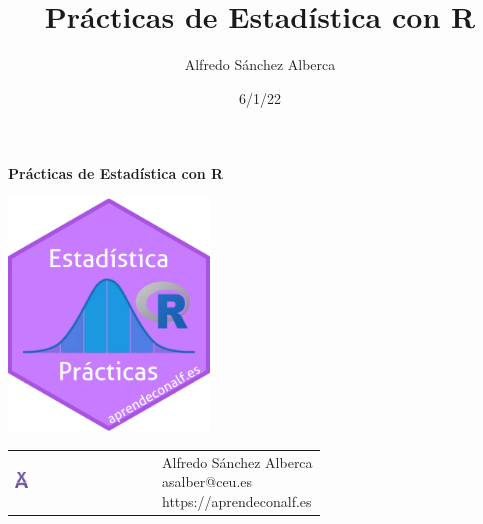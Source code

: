 \documentclass[
  a4paper,
]{scrreport}
\title{Prácticas de Estadística con R}
\author{Alfredo Sánchez Alberca}
\date{6/1/22}
\renewcommand*\contentsname{Tabla de contenidos}
\newcommand\contentsname{Tabla de contenidos}
\theoremstyle{definition}
\theoremstyle{remark}
\begin{document}
\begin{titlepage}

\begin{center}
\vspace*{5cm}

\Huge
{\textbf{\textsf{Prácticas de Estadística con R}}}

\vspace{0.5cm}
\LARGE
{\textbf{\textsf{}}}

\vspace{1.5cm}

\includegraphics[width=0.4\textwidth]{img/logos/sticker-estadistica-r.png}
\end{center}

\vfill

\begin{flushleft}
\begin{tabular}{ll}
\includegraphics[width=0.1\textwidth]{img/logos/aprendeconalf.png} & \parbox[b]{5cm}{\Large\textsf{Alfredo
Sánchez
Alberca}\\ \textsf{asalber@ceu.es} \\ \textsf{https://aprendeconalf.es}}
\end{tabular}
\end{flushleft}
\end{titlepage}\ifdefined\Shaded\renewenvironment{Shaded}{\begin{tcolorbox}[enhanced, interior hidden, frame hidden, breakable, sharp corners, borderline west={3pt}{0pt}{shadecolor}, boxrule=0pt]}{\end{tcolorbox}}\fi

\renewcommand*\contentsname{Tabla de contenidos}
{
\hypersetup{linkcolor=}
\setcounter{tocdepth}{2}
\tableofcontents
}
\end{document}
